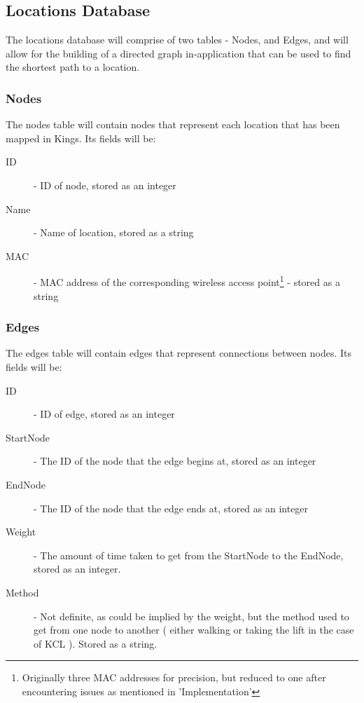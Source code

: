 \documentclass[11pt]{informatics-report}
\begin{document}
\subsection{Locations Database}

The locations database will comprise of two tables - Nodes, and Edges, and will allow for the building of a directed graph in-application that can be used to find the shortest path to a location.

\subsubsection{Nodes}

The nodes table will contain nodes that represent each location that has been mapped in Kings. Its fields will be: 

\begin{description}
\item[ID] - ID of node, stored as an integer
\item[Name] - Name of location, stored as a string
\item[MAC] - MAC address of the corresponding wireless access point\footnote{Originally three MAC addresses for precision, but reduced to one after encountering issues as mentioned in 'Implementation'} - stored as a string
\end{description}

\subsubsection{Edges}

The edges table will contain edges that represent connections between nodes. Its fields will be:

\begin{description}
\item[ID] - ID of edge, stored as an integer
\item[StartNode] - The ID of the node that the edge begins at, stored as an integer
\item[EndNode] - The ID of the node that the edge ends at, stored as an integer
\item[Weight] - The amount of time taken to get from the StartNode to the EndNode, stored as an integer.
\item[Method] - Not definite, as could be implied by the weight, but the method used to get from one node to another ( either walking or taking the lift in the case of KCL ). Stored as a string. 
\end{description}
\end{document}
